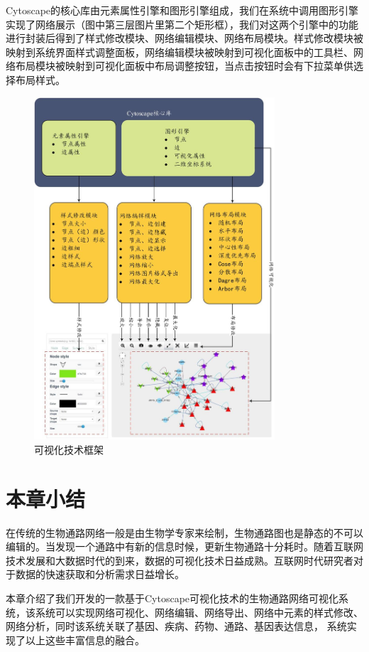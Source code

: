 Cytoscape的核心库由元素属性引擎和图形引擎组成，我们在系统中调用图形引擎实现了网络展示（图中第三层图片里第二个矩形框），我们对这两个引擎中的功能进行封装后得到了样式修改模块、网络编辑模块、网络布局模块。样式修改模块被映射到系统界面样式调整面板，网络编辑模块被映射到可视化面板中的工具栏、网络布局模块被映射到可视化面板中布局调整按钮，当点击按钮时会有下拉菜单供选择布局样式。

\begin{figure}[h]
\centering
\includegraphics[width = 0.8\textwidth]{versioframework}
\caption[fig33]{可视化技术框架}
\label{fig33}
\end{figure}

\section{本章小结}
在传统的生物通路网络一般是由生物学专家来绘制，生物通路图也是静态的不可以编辑的。当发现一个通路中有新的信息时候，更新生物通路十分耗时。随着互联网技术发展和大数据时代的到来，数据的可视化技术日益成熟。互联网时代研究者对于数据的快速获取和分析需求日益增长。

本章介绍了我们开发的一款基于Cytoscape可视化技术的生物通路网络可视化系统，该系统可以实现网络可视化、网络编辑、网络导出、网络中元素的样式修改、网络分析，同时该系统关联了基因、疾病、药物、通路、基因表达信息， 系统实现了以上这些丰富信息的融合。
